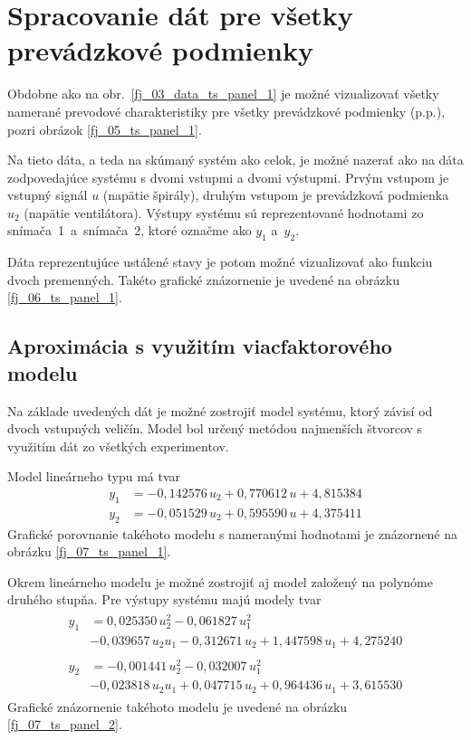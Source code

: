 \documentclass[a4paper, 10pt, ]{article}
\begin{document}
\section{Spracovanie dát pre všetky prevádzkové podmienky}

Obdobne ako na obr.~\ref{fj_03_data_ts_panel_1} je možné vizualizovať všetky namerané prevodové charakteristiky pre všetky prevádzkové podmienky (p.p.), pozri obrázok \ref{fj_05_ts_panel_1}. 

Na tieto dáta, a teda na skúmaný systém ako celok, je možné nazerať ako na dáta zodpovedajúce systému s dvomi vstupmi a dvomi výstupmi. Prvým vstupom je vstupný signál $u$ (napätie špirály), druhým vstupom je prevádzková podmienka $u_2$ (napätie ventilátora). Výstupy systému sú reprezentované hodnotami zo snímača~1~a~snímača~2, ktoré označme ako $y_1$ a~$y_2$.

Dáta reprezentujúce ustálené stavy je potom možné vizualizovať ako funkciu dvoch premenných. Takéto grafické znázornenie je uvedené na obrázku \ref{fj_06_ts_panel_1}.













\subsection{Aproximácia s využitím viacfaktorového modelu}

Na základe uvedených dát je možné zostrojiť model systému, ktorý závisí od dvoch vstupných veličín. Model bol určený metódou najmenších štvorcov s využitím dát zo všetkých experimentov.

Model lineárneho typu má tvar
\begin{align}
y_1 &= -0,142576\,u_2 + 0,770612\,u + 4,815384 \\
y_2 &= -0,051529\,u_2 + 0,595590\,u + 4,375411
\end{align}
Grafické porovnanie takéhoto modelu s nameranými hodnotami je znázornené na obrázku \ref{fj_07_ts_panel_1}.



Okrem lineárneho modelu je možné zostrojiť aj model založený na polynóme druhého stupňa. Pre výstupy systému majú modely tvar
\begin{align}
\begin{aligned}
y_1 &=
0,025350\,u_2^2
-0,061827\,u_1^2
\\&-0,039657\,u_2 u_1
-0,312671\,u_2
+1,447598\,u_1
+4,275240
\end{aligned}
\\
\begin{aligned}
y_2 &=
-0,001441\,u_2^2
-0,032007\,u_1^2
\\&-0,023818\,u_2 u_1
+0,047715\,u_2
+0,964436\,u_1
+3,615530
\end{aligned}
\end{align}
Grafické znázornenie takéhoto modelu je uvedené na obrázku \ref{fj_07_ts_panel_2}.
\end{document}
